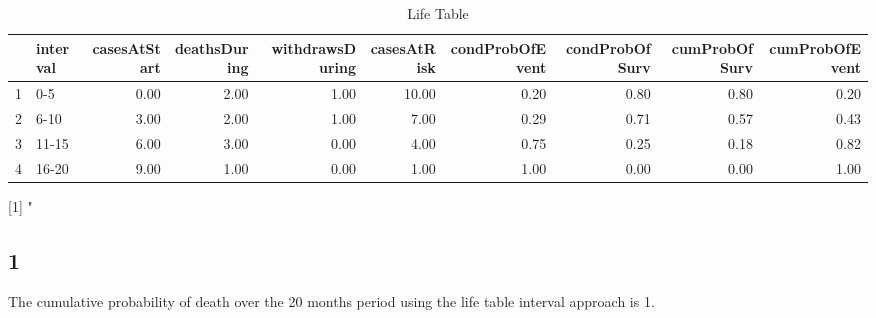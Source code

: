 \documentclass[12pt]{article}
\begin{document}
\begin{table}[ht]
\centering
\caption{Life Table} 
{\tiny
\begin{tabular}{rlrrrrrrrr}
  \hline
 & interval & casesAtStart & deathsDuring & withdrawsDuring & casesAtRisk & condProbOfEvent & condProbOfSurv & cumProbOfSurv & cumProbOfEvent \\ 
  \hline
1 & 0-5 & 0.00 & 2.00 & 1.00 & 10.00 & 0.20 & 0.80 & 0.80 & 0.20 \\ 
  2 & 6-10 & 3.00 & 2.00 & 1.00 & 7.00 & 0.29 & 0.71 & 0.57 & 0.43 \\ 
  3 & 11-15 & 6.00 & 3.00 & 0.00 & 4.00 & 0.75 & 0.25 & 0.18 & 0.82 \\ 
  4 & 16-20 & 9.00 & 1.00 & 0.00 & 1.00 & 1.00 & 0.00 & 0.00 & 1.00 \\ 
   \hline
\end{tabular}
}
\end{table}
[1] "%
\subsection*{1}
The cumulative probability of death over the 20 months period using the life table interval approach is 1. \\
\end{document}
